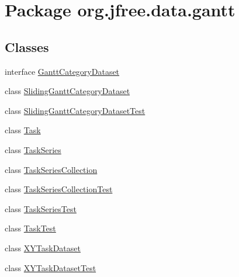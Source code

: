 \hypertarget{namespaceorg_1_1jfree_1_1data_1_1gantt}{}\section{Package org.\+jfree.\+data.\+gantt}
\label{namespaceorg_1_1jfree_1_1data_1_1gantt}
\subsection*{Classes}
\begin{DoxyCompactItemize}
\item 
interface \mbox{\hyperlink{interfaceorg_1_1jfree_1_1data_1_1gantt_1_1_gantt_category_dataset}{Gantt\+Category\+Dataset}}
\item 
class \mbox{\hyperlink{classorg_1_1jfree_1_1data_1_1gantt_1_1_sliding_gantt_category_dataset}{Sliding\+Gantt\+Category\+Dataset}}
\item 
class \mbox{\hyperlink{classorg_1_1jfree_1_1data_1_1gantt_1_1_sliding_gantt_category_dataset_test}{Sliding\+Gantt\+Category\+Dataset\+Test}}
\item 
class \mbox{\hyperlink{classorg_1_1jfree_1_1data_1_1gantt_1_1_task}{Task}}
\item 
class \mbox{\hyperlink{classorg_1_1jfree_1_1data_1_1gantt_1_1_task_series}{Task\+Series}}
\item 
class \mbox{\hyperlink{classorg_1_1jfree_1_1data_1_1gantt_1_1_task_series_collection}{Task\+Series\+Collection}}
\item 
class \mbox{\hyperlink{classorg_1_1jfree_1_1data_1_1gantt_1_1_task_series_collection_test}{Task\+Series\+Collection\+Test}}
\item 
class \mbox{\hyperlink{classorg_1_1jfree_1_1data_1_1gantt_1_1_task_series_test}{Task\+Series\+Test}}
\item 
class \mbox{\hyperlink{classorg_1_1jfree_1_1data_1_1gantt_1_1_task_test}{Task\+Test}}
\item 
class \mbox{\hyperlink{classorg_1_1jfree_1_1data_1_1gantt_1_1_x_y_task_dataset}{X\+Y\+Task\+Dataset}}
\item 
class \mbox{\hyperlink{classorg_1_1jfree_1_1data_1_1gantt_1_1_x_y_task_dataset_test}{X\+Y\+Task\+Dataset\+Test}}
\end{DoxyCompactItemize}
